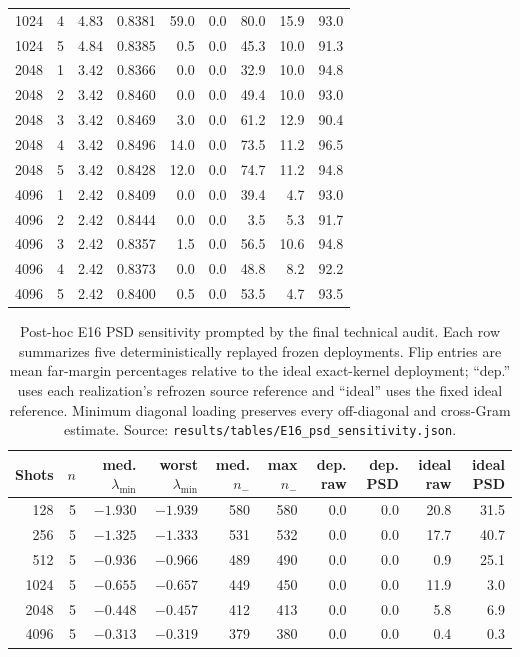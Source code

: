 \documentclass[11pt,a4paper]{article}
\begin{document}
\begin{table}[H]
\begin{tabular}{rrrrrrrrr}
1024 & 4 & 4.83 & 0.8381 & 59.0 & 0.0 & 80.0 & 15.9 & 93.0 \\
1024 & 5 & 4.84 & 0.8385 & 0.5 & 0.0 & 45.3 & 10.0 & 91.3 \\
2048 & 1 & 3.42 & 0.8366 & 0.0 & 0.0 & 32.9 & 10.0 & 94.8 \\
2048 & 2 & 3.42 & 0.8460 & 0.0 & 0.0 & 49.4 & 10.0 & 93.0 \\
2048 & 3 & 3.42 & 0.8469 & 3.0 & 0.0 & 61.2 & 12.9 & 90.4 \\
2048 & 4 & 3.42 & 0.8496 & 14.0 & 0.0 & 73.5 & 11.2 & 96.5 \\
2048 & 5 & 3.42 & 0.8428 & 12.0 & 0.0 & 74.7 & 11.2 & 94.8 \\
4096 & 1 & 2.42 & 0.8409 & 0.0 & 0.0 & 39.4 & 4.7 & 93.0 \\
4096 & 2 & 2.42 & 0.8444 & 0.0 & 0.0 & 3.5 & 5.3 & 91.7 \\
4096 & 3 & 2.42 & 0.8357 & 1.5 & 0.0 & 56.5 & 10.6 & 94.8 \\
4096 & 4 & 2.42 & 0.8373 & 0.0 & 0.0 & 48.8 & 8.2 & 92.2 \\
4096 & 5 & 2.42 & 0.8400 & 0.5 & 0.0 & 53.5 & 4.7 & 93.5 \\
\bottomrule
\end{tabular}
\end{table}

\begin{table}[H]
\centering
\scriptsize
\setlength{\tabcolsep}{2.5pt}
\caption{Post-hoc E16 PSD sensitivity prompted by the final technical audit.
Each row summarizes five deterministically replayed frozen deployments. Flip
entries are mean far-margin percentages relative to the ideal exact-kernel
deployment; ``dep.'' uses each realization's refrozen source reference and
``ideal'' uses the fixed ideal reference. Minimum diagonal loading preserves
every off-diagonal and cross-Gram estimate. Source:
\texttt{results/tables/E16\_psd\_sensitivity.json}.}
\label{tab:e16-psd}
\begin{tabular}{rrrrrrrrrr}
\toprule
Shots & $n$ & med. $\lambda_{\min}$ & worst $\lambda_{\min}$ & med. $n_-$ & max $n_-$ & dep. raw & dep. PSD & ideal raw & ideal PSD \\
\midrule
128  & 5 & $-1.930$ & $-1.939$ & 580 & 580 & 0.0 & 0.0 & 20.8 & 31.5 \\
256  & 5 & $-1.325$ & $-1.333$ & 531 & 532 & 0.0 & 0.0 & 17.7 & 40.7 \\
512  & 5 & $-0.936$ & $-0.966$ & 489 & 490 & 0.0 & 0.0 & 0.9 & 25.1 \\
1024 & 5 & $-0.655$ & $-0.657$ & 449 & 450 & 0.0 & 0.0 & 11.9 & 3.0 \\
2048 & 5 & $-0.448$ & $-0.457$ & 412 & 413 & 0.0 & 0.0 & 5.8 & 6.9 \\
4096 & 5 & $-0.313$ & $-0.319$ & 379 & 380 & 0.0 & 0.0 & 0.4 & 0.3 \\
\bottomrule
\end{tabular}
\end{table}
\end{document}
